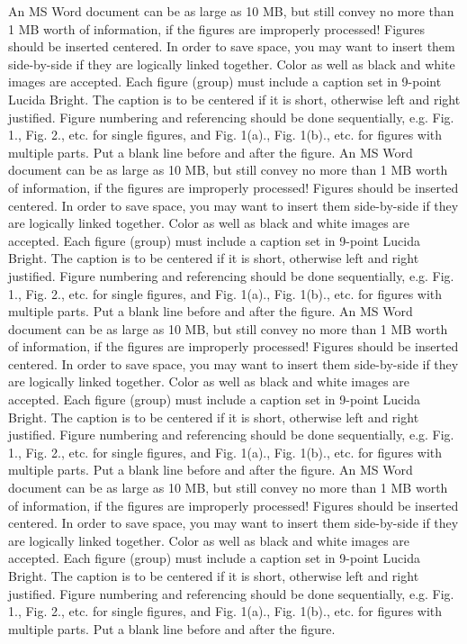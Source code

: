 \documentclass[9pt,a4paper]{article}
\begin{document}
An MS Word document can be as large as 10 MB, but still convey no more than 1 MB worth of information, if the figures are improperly processed! Figures should be inserted centered. In order to save space, you may want to insert them side-by-side if they are logically linked together. Color as well as black and white images are accepted. Each figure (group) must include a caption set in 9-point Lucida Bright. The caption is to be centered if it is short, otherwise left and right justified. Figure numbering and referencing should be done sequentially, e.g. Fig. 1., Fig. 2., etc. for single figures, and Fig. 1(a)., Fig. 1(b)., etc. for figures with multiple parts. Put a blank line before and after the figure.
An MS Word document can be as large as 10 MB, but still convey no more than 1 MB worth of information, if the figures are improperly processed! Figures should be inserted centered. In order to save space, you may want to insert them side-by-side if they are logically linked together. Color as well as black and white images are accepted. Each figure (group) must include a caption set in 9-point Lucida Bright. The caption is to be centered if it is short, otherwise left and right justified. Figure numbering and referencing should be done sequentially, e.g. Fig. 1., Fig. 2., etc. for single figures, and Fig. 1(a)., Fig. 1(b)., etc. for figures with multiple parts. Put a blank line before and after the figure.
An MS Word document can be as large as 10 MB, but still convey no more than 1 MB worth of information, if the figures are improperly processed! Figures should be inserted centered. In order to save space, you may want to insert them side-by-side if they are logically linked together. Color as well as black and white images are accepted. Each figure (group) must include a caption set in 9-point Lucida Bright. The caption is to be centered if it is short, otherwise left and right justified. Figure numbering and referencing should be done sequentially, e.g. Fig. 1., Fig. 2., etc. for single figures, and Fig. 1(a)., Fig. 1(b)., etc. for figures with multiple parts. Put a blank line before and after the figure.
An MS Word document can be as large as 10 MB, but still convey no more than 1 MB worth of information, if the figures are improperly processed! Figures should be inserted centered. In order to save space, you may want to insert them side-by-side if they are logically linked together. Color as well as black and white images are accepted. Each figure (group) must include a caption set in 9-point Lucida Bright. The caption is to be centered if it is short, otherwise left and right justified. Figure numbering and referencing should be done sequentially, e.g. Fig. 1., Fig. 2., etc. for single figures, and Fig. 1(a)., Fig. 1(b)., etc. for figures with multiple parts. Put a blank line before and after the figure.
\end{document}
